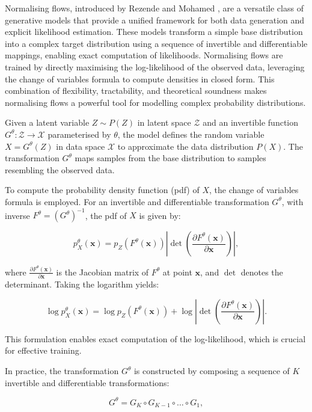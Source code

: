 Normalising flows, introduced by Rezende and Mohamed \cite{rezende2015variational}, are a versatile class of generative models that provide a unified framework for both data generation and explicit likelihood estimation. These models transform a simple base distribution into a complex target distribution using a sequence of invertible and differentiable mappings, enabling exact computation of likelihoods. Normalising flows are trained by directly maximising the log-likelihood of the observed data, leveraging the change of variables formula to compute densities in closed form. This combination of flexibility, tractability, and theoretical soundness makes normalising flows a powerful tool for modelling complex probability distributions.

Given a latent variable $Z \sim P(Z)$ in latent space $\mathcal{Z}$ and an invertible function $G^\theta: \mathcal{Z} \rightarrow \mathcal{X}$ parameterised by $\theta$, the model defines the random variable $X = G^\theta(Z)$ in data space $\mathcal{X}$ to approximate the data distribution $P(X)$. The transformation $G^\theta$ maps samples from the base distribution to samples resembling the observed data.

To compute the probability density function (pdf) of $X$, the change of variables formula is employed. For an invertible and differentiable transformation $G^\theta$, with inverse $F^\theta = (G^\theta)^{-1}$, the pdf of $X$ is given by:

\[
p^\theta_X(\mathbf{x}) = p_Z\left(F^\theta(\mathbf{x})\right) \left| \det \left( \frac{\partial F^\theta(\mathbf{x})}{\partial \mathbf{x}} \right) \right|,
\]

\noindent where $\frac{\partial F^\theta(\mathbf{x})}{\partial \mathbf{x}}$ is the Jacobian matrix of $F^\theta$ at point $\mathbf{x}$, and $\det$ denotes the determinant. Taking the logarithm yields:

\[
\log p^\theta_X(\mathbf{x}) = \log p_Z\left(F^\theta(\mathbf{x})\right) + \log \left| \det \left( \frac{\partial F^\theta(\mathbf{x})}{\partial \mathbf{x}} \right) \right|.
\]

This formulation enables exact computation of the log-likelihood, which is crucial for effective training.

In practice, the transformation $G^\theta$ is constructed by composing a sequence of $K$ invertible and differentiable transformations:

\[
G^\theta = G_K \circ G_{K-1} \circ \dots \circ G_1,
\]

